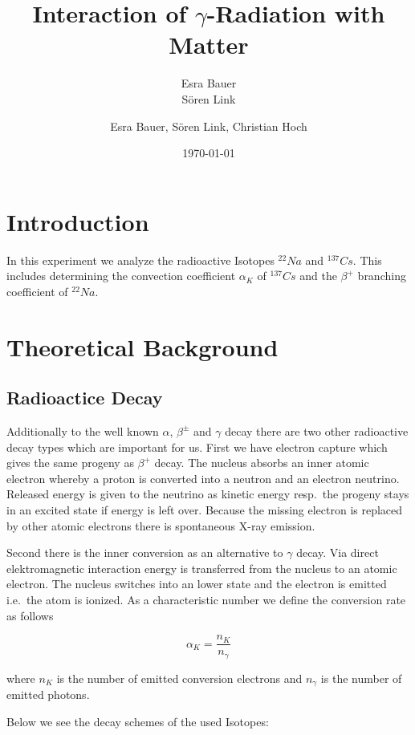 \documentclass[bigchapter,colorback,accentcolor=tud4b,linedtoc,11pt]{tudreport}
\title{Interaction of $\gamma$-Radiation with Matter}
\subtitle{Esra Bauer  \\Sören Link}
\author{Esra Bauer, Sören Link, Christian Hoch}
\date{\today}
\begin{document}

\maketitle

\tableofcontents

\chapter{Introduction}
In this experiment we analyze the radioactive Isotopes $^{22}Na$ and
$^{137}Cs$. This includes determining the convection coefficient $\alpha_K$ of
$^{137}Cs$ and the $\beta^+$ branching coefficient of $^{22}Na$.

\chapter{Theoretical Background}
\section{Radioactice Decay}

Additionally to the well known $\alpha$, $\beta^{\pm}$ and $\gamma$ decay there are two other radioactive decay types which are important for us. First we have electron capture which gives the same progeny as $\beta^+$ decay. The nucleus absorbs an inner atomic electron whereby a proton is converted into a neutron and an electron neutrino. Released energy is given to the neutrino as kinetic energy resp.\ the progeny stays in an excited state if energy is left over. Because the missing electron is replaced by other atomic electrons there is spontaneous X-ray emission.

Second there is the inner conversion as an alternative to $\gamma$ decay. Via direct elektromagnetic interaction energy is transferred from the nucleus to an atomic electron. The nucleus switches into an lower state and the electron is emitted i.e.\ the atom is ionized. As a characteristic number we define the conversion rate as follows

$$\alpha_K = \frac{n_K}{n_{\gamma}}$$

where $n_K$ is the number of emitted conversion electrons and $n_{\gamma}$ is the number of emitted photons.

Below we see the decay schemes of the used Isotopes:
\end{document}
